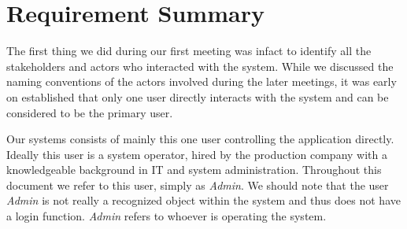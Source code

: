 \documentclass[12pt,a4paper,man]{report}
\begin{document}
\chapter{Requirement Summary}
\label{sec:org12b6275}
The first thing we did during our first meeting was infact to identify all the stakeholders and actors who interacted with the system. While we discussed the naming conventions of the actors involved during the later meetings, it was early on established that only one user directly interacts with the system and can be considered to be the primary user.

Our systems consists of mainly this one user controlling the application directly. Ideally this user is a system operator, hired by the production company with a knowledgeable background in IT and system administration. Throughout this document we refer to this user, simply as \emph{Admin}. We should note that the user \emph{Admin} is not really a recognized object within the system and thus does not have a login function. \emph{Admin} refers to whoever is operating the system.
\end{document}

